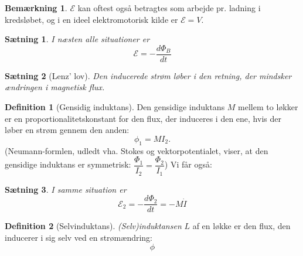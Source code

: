 \documentclass[]{article}
\newtheorem{theorem}{Sætning}
\theoremstyle{definition}
\newtheorem{definition}{Definition}
\newtheorem{remark}{Bemærkning}
\begin{document}
\begin{remark}
	$\mathcal{E}$ kan oftest også betragtes som arbejde pr. ladning i kredsløbet, og i en ideel elektromotorisk kilde er $\mathcal{E} = V$.
\end{remark}

\begin{theorem}
	I næsten alle situationer er
\begin{equation*} 
	\mathcal{E} = -\dfrac{d \Phi_B}{dt}
\end{equation*}
\end{theorem}

\begin{theorem}[Lenz' lov]
	Den inducerede strøm løber i den retning, der mindsker ændringen i magnetisk flux.
\end{theorem}

\begin{definition}[Gensidig induktans]
	Den gensidige induktans $M$ mellem to løkker er en proportionalitetskonstant for den flux, der induceres i den ene, hvis der løber en strøm gennem den anden:
	\begin{equation*}
		\phi_1 = MI_2.
	\end{equation*}
	(Neumann-formlen, udledt vha. Stokes og vektorpotentialet, viser, at den gensidige induktans er symmetrisk: $ \dfrac{\Phi_1}{I_2} = \dfrac{\Phi_2}{I_1}$)
	Vi får også:
	\begin{theorem}
		I samme situation er
		\begin{equation*}
			\mathcal{E}_2 = -\frac{d \Phi_2}{dt} = - M \dot I
		\end{equation*}
	\end{theorem}
\end{definition}

\begin{definition}[Selvinduktans]
	\emph{(Selv)induktansen} $L$ af en løkke er den flux, den inducerer i sig selv ved en strømændring:
	\begin{equation*}
		\phi 
	\end{equation*}
\end{definition}

\end{document}
